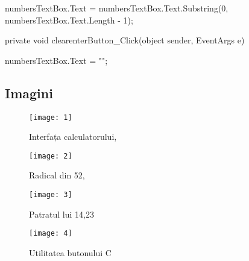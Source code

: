         {
           
            numbersTextBox.Text = numbersTextBox.Text.Substring(0, numbersTextBox.Text.Length - 1);
       
        }

        private void clearenterButton_Click(object sender, EventArgs e)
        
        {
            
            numbersTextBox.Text = "";
            
        }
   

    
\subsection{Imagini}

\begin{figure}[!ht]
\centering
\texttt{[image: 1]}
\caption{Interfața calculatorului, \cite{ImRef}}
\label{Im_label}
\end{figure}

\begin{figure}[!ht]
\centering
\texttt{[image: 2]}
\caption{Radical din 52, \cite{ImRef}}
\label{Im_label}
\end{figure}

\begin{figure}[!ht]
\centering
\texttt{[image: 3]}
\caption{Patratul lui 14,23 \cite{ImRef}}
\label{Im_label}
\end{figure}


\begin{figure}[!ht]
\centering
\texttt{[image: 4]}
\caption{Utilitatea butonului C \cite{ImRef}}
\label{Im_label}
\end{figure}

\clearpage
